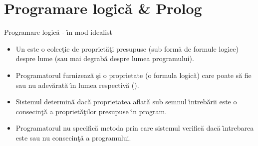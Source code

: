 \documentclass[xcolor=x11names,compress,10pt]{beamer}
\begin{document}
\section{Programare logic\u a \& Prolog} \sectionframe



\begin{frame}{Programare logic\u a - \^\i n mod idealist}
\begin{itemize}
	\item Un  este o colec\c tie de propriet\u a\c ti presupuse (sub form\u a de formule logice) despre lume (sau mai degrab\u a despre lumea programului).
	\medskip
	\item Programatorul furnizeaz\u a \c si o proprietate (o formula logic\u a) care poate s\u a fie sau nu adev\u arat\u a \^\i n lumea respectiv\u a ().
	\medskip
	\item Sistemul determin\u a dac\u a proprietatea aflat\u a sub semnul \^\i ntreb\u arii este o consecin\c t\u a a propriet\u a\c tilor presupuse \^\i n program.
	\medskip
		\item Programatorul nu specific\u a metoda prin care sistemul verific\u a dac\u a \^\i ntrebarea este sau nu consecin\c t\u a a programului.
\end{itemize}
\end{frame}

\end{document}
